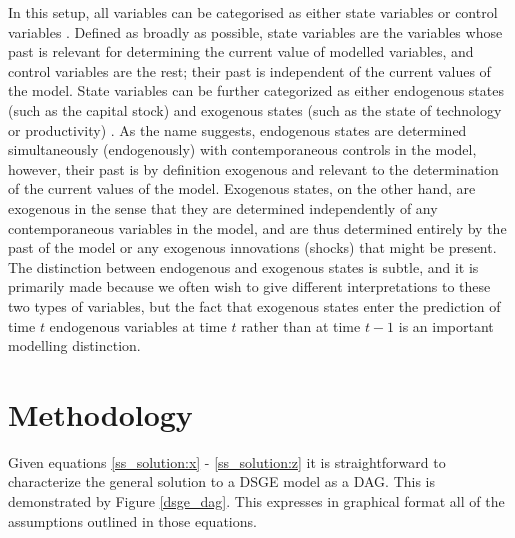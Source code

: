 \documentclass{article}
\begin{document}
In this setup, all variables can be categorised as either state variables or control variables \parencite{fernandez2016solution}. Defined as broadly as possible, state variables are the variables whose past is relevant for determining the current value of modelled variables, and control variables are the rest; their past is independent of the current values of the model. State variables can be further categorized as either endogenous states (such as the capital stock) and exogenous states (such as the state of technology or productivity) \parencite{ravenna2007vector}. As the name suggests, endogenous states are determined simultaneously (endogenously) with contemporaneous controls in the model, however, their past is by definition exogenous and relevant to the determination of the current values of the model. Exogenous states, on the other hand, are exogenous in the sense that they are determined independently of any contemporaneous variables in the model, and are thus determined entirely by the past of the model or any exogenous innovations (shocks) that might be present. The distinction between endogenous and exogenous states is subtle, and it is primarily made because we often wish to give different interpretations to these two types of variables, but the fact that exogenous states enter the prediction of time $t$ endogenous variables at time $t$ rather than at time $t-1$ is an important modelling distinction.

\section{Methodology}

Given equations \ref{ss_solution:x} - \ref{ss_solution:z} it is straightforward to characterize the general solution to a DSGE model as a DAG. This is demonstrated by Figure \ref{dsge_dag}. This expresses in graphical format all of the assumptions outlined in those equations. 
\end{document}
